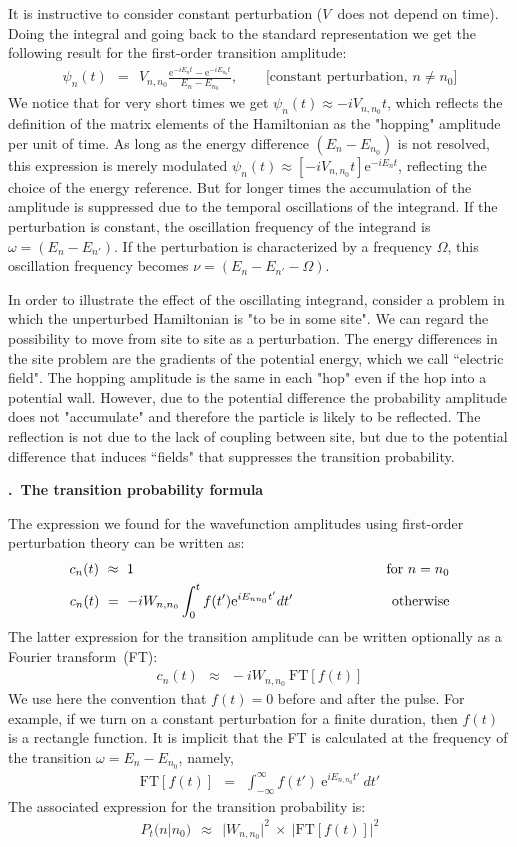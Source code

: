 \documentclass[onecolumn,fleqn, 11pt]{revtex4}
\newcommand{\eexp}{\mathrm{e}^}
\newcommand{\beq}{\begin{eqnarray}}
\newcommand{\eeq}{\end{eqnarray}}
\renewcommand{\thesubsection}{\arabic{subsection}}
\renewcommand{\thesubsubsection}{\arabic{subsubsection}}
\newcommand{\sheadC}[1]
{
\addtocounter{subsubsection}{1}
\vspace{5mm}
{\bf \thesubsection.\thesubsubsection \ #1}  
\nopagebreak
\phantomsection
}
\begin{document}
It is instructive to consider constant perturbation ($V$~does not depend on time). 
Doing the integral and going back to the standard representation 
we get the following result for the first-order transition amplitude:
 \beq 
\psi_n(t) \ \ = \ \ V_{n,n_0}\frac{\eexp{-iE_{n}t}-\eexp{-iE_{n_0}t}}{E_{n}-E_{n_0}}, 
\ \ \ \ \ \ \ \ \ \mbox{[constant perturbation, $n \neq n_0$]}
\eeq
We notice that for very short times we get ${\psi_n(t) \approx -iV_{n,n_0} t}$, 
which reflects the definition of the matrix elements of the Hamiltonian as 
the "hopping" amplitude per unit of time. As long as the 
energy difference ${(E_n-E_{n_0})}$ is not resolved, 
this expression is merely modulated  ${\psi_n(t) \approx [-iV_{n,n_0} t] \eexp{-iE_nt}}$,  
reflecting the choice of the energy reference.  
But for longer times the accumulation of the amplitude 
is suppressed due to the temporal oscillations of the integrand. 
If the perturbation is constant, the oscillation frequency 
of the integrand is ${\omega= (E_n-E_{n'})}$. 
If the perturbation is characterized by a frequency $\Omega$, 
this oscillation frequency becomes ${\nu = (E_n-E_{n'}-\Omega)}$.

In order to illustrate the effect of the oscillating integrand, consider 
a problem in which the unperturbed Hamiltonian is "to be in some site". 
We can regard the possibility to move from site to site as a perturbation. 
The energy differences in the site problem are the gradients 
of the potential energy, which we call ``electric field". 
The hopping amplitude is the same in each "hop" even if the hop 
into a potential wall. However, due to the potential difference 
the probability amplitude does not "accumulate" and therefore 
the particle is likely to be reflected. The reflection is not due 
to the lack of coupling between site, but due to the potential 
difference that induces ``fields" that suppresses the transition probability. 


\sheadC{The transition probability formula}

The expression we found for the wavefunction amplitudes  
using first-order perturbation theory can be written as:
\beq
c_n(t) \ \approx \ 1  \hspace*{6cm}  &&  \mbox{for} \ n=n_0
\\ 
c_n(t) \  = \ -i W_{n,n_0} \int_0^t f(t') \eexp{i E_{nn_0} t'} dt' \hspace{2cm} && \mbox{otherwise} 
\eeq
The latter expression for the transition amplitude 
can be written optionally as a Fourier transform~(FT):  
\beq
c_n(t) \ \ \approx \ \  -iW_{n,n_0} \ \mbox{FT} \left[ f(t) \right] 
\eeq
We use here the convention that ${f(t)=0}$ before and after the pulse. 
For example, if we turn on a constant perturbation for a finite duration, 
then ${f(t)}$ is a rectangle function.
It is implicit that the FT is calculated at the 
frequency of the transition ${\omega=E_n-E_{n_0}}$, namely, 
\beq
\mbox{FT} \left[f(t)\right] \ \ = \ \ \int_{-\infty}^{\infty}f(t') \ \eexp{iE_{n,n_0} t'} \ dt' 
\eeq
The associated expression for the transition probability is:
\beq
P_t(n|n_0) \ \  \approx \ \  |W_{n,n_0}|^2 \ \times \ \Big| \mbox{FT} \left[ f(t) \right] \Big|^2 
\eeq
\end{document}
